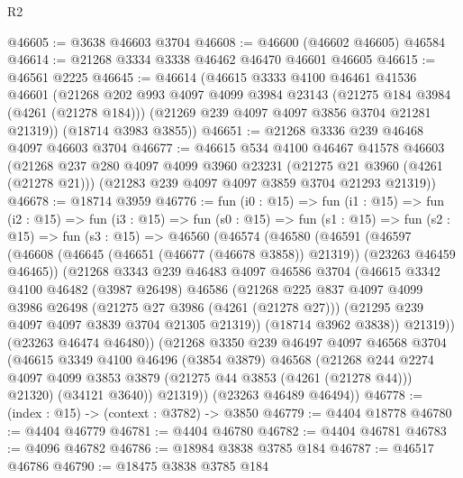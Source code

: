 \begin{lexlean}{R2}
\begin{coremodule}
@46605 := @3638 @46603 @3704
@46608 := @46600 (@46602 @46605) @46584
@46614 := @21268 @3334 @3338 @46462 @46470 @46601 @46605
@46615 := @46561 @2225
@46645 := @46614
    (@46615
      @3333
      @4100
      @46461
      @41536
      @46601
      (@21268
        @202
        @993
        @4097
        @4099
        @3984
        @23143
        (@21275 @184 @3984 (@4261 (@21278 @184)))
        (@21269 @239 @4097 @4097 @3856 @3704 @21281 @21319))
      (@18714 @3983 @3855))
@46651 := @21268 @3336 @239 @46468 @4097 @46603 @3704
@46677 := @46615
    @534
    @4100
    @46467
    @41578
    @46603
    (@21268
      @237
      @280
      @4097
      @4099
      @3960
      @23231
      (@21275 @21 @3960 (@4261 (@21278 @21)))
      (@21283 @239 @4097 @4097 @3859 @3704 @21293 @21319))
@46678 := @18714 @3959
@46776 := fun (i0 : @15) =>
  fun (i1 : @15) =>
  fun (i2 : @15) =>
  fun (i3 : @15) =>
  fun (s0 : @15) =>
  fun (s1 : @15) =>
  fun (s2 : @15) =>
  fun (s3 : @15) =>
  @46560
    (@46574
      (@46580
        (@46591
          (@46597
            (@46608 (@46645 (@46651 (@46677 (@46678 @3858)) @21319)) (@23263 @46459 @46465))
            (@21268
              @3343
              @239
              @46483
              @4097
              @46586
              @3704
              (@46615
                @3342
                @4100
                @46482
                (@3987 @26498)
                @46586
                (@21268
                  @225
                  @837
                  @4097
                  @4099
                  @3986
                  @26498
                  (@21275 @27 @3986 (@4261 (@21278 @27)))
                  (@21295 @239 @4097 @4097 @3839 @3704 @21305 @21319))
                (@18714 @3962 @3838))
              @21319))
          (@23263 @46474 @46480))
        (@21268
          @3350
          @239
          @46497
          @4097
          @46568
          @3704
          (@46615
            @3349
            @4100
            @46496
            (@3854 @3879)
            @46568
            (@21268
              @244
              @2274
              @4097
              @4099
              @3853
              @3879
              (@21275 @44 @3853 (@4261 (@21278 @44)))
              @21320)
            (@34121 @3640))
          @21319))
      (@23263 @46489 @46494))
@46778 := (index : @15) -> (context : @3782) -> @3850
@46779 := @4404 @18778
@46780 := @4404 @46779
@46781 := @4404 @46780
@46782 := @4404 @46781
@46783 := @4096 @46782
@46786 := @18984 @3838 @3785 @184
@46787 := @46517 @46786
@46790 := @18475 @3838 @3785 @184

\end{coremodule}
\end{lexlean}
